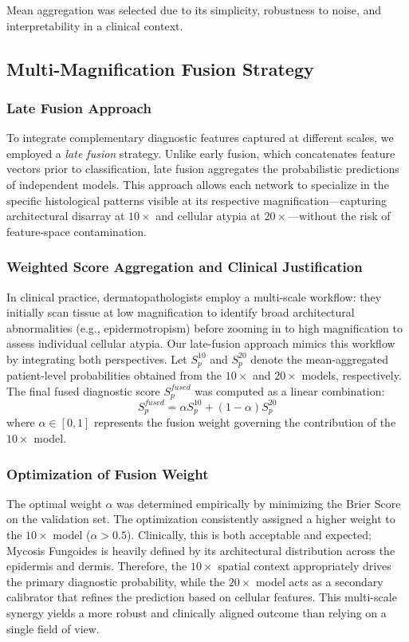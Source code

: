 \documentclass[runningheads]{llncs}
\begin{document}
Mean aggregation was selected due to its simplicity, robustness to noise, and interpretability in a clinical context.

\subsection{Multi-Magnification Fusion Strategy}

\subsubsection{Late Fusion Approach}
To integrate complementary diagnostic features captured at different scales, we employed a \textit{late fusion} strategy. Unlike early fusion, which concatenates feature vectors prior to classification, late fusion aggregates the probabilistic predictions of independent models. This approach allows each network to specialize in the specific histological patterns visible at its respective magnification—capturing architectural disarray at $10\times$ and cellular atypia at $20\times$—without the risk of feature-space contamination.

\subsubsection{Weighted Score Aggregation and Clinical Justification}
In clinical practice, dermatopathologists employ a multi-scale workflow: they initially scan tissue at low magnification to identify broad architectural abnormalities (e.g., epidermotropism) before zooming in to high magnification to assess individual cellular atypia. Our late-fusion approach mimics this workflow by integrating both perspectives. Let $S_{p}^{10}$ and $S_{p}^{20}$ denote the mean-aggregated patient-level probabilities obtained from the $10\times$ and $20\times$ models, respectively. The final fused diagnostic score $S_{p}^{fused}$ was computed as a linear combination:
\begin{equation}
S_{p}^{fused} = \alpha S_{p}^{10} + (1 - \alpha) S_{p}^{20}
\end{equation}
where $\alpha \in [0, 1]$ represents the fusion weight governing the contribution of the $10\times$ model.

\subsubsection{Optimization of Fusion Weight}
The optimal weight $\alpha$ was determined empirically by minimizing the Brier Score on the validation set. The optimization consistently assigned a higher weight to the $10\times$ model ($\alpha > 0.5$). Clinically, this is both acceptable and expected; Mycosis Fungoides is heavily defined by its architectural distribution across the epidermis and dermis. Therefore, the $10\times$ spatial context appropriately drives the primary diagnostic probability, while the $20\times$ model acts as a secondary calibrator that refines the prediction based on cellular features. This multi-scale synergy yields a more robust and clinically aligned outcome than relying on a single field of view. 
\end{document}
